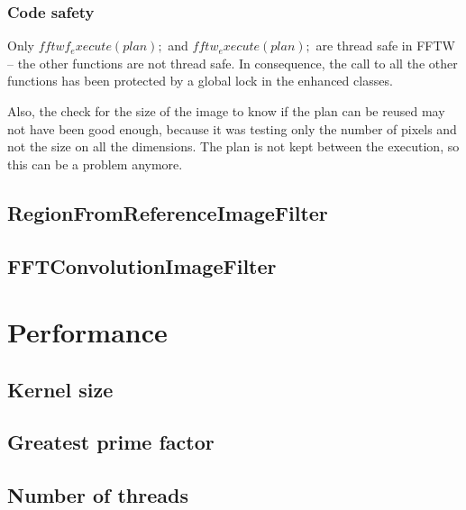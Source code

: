 \documentclass{InsightArticle}
\begin{document}
\subsubsection{Code safety}

Only $fftwf_execute(plan);$ and $fftw_execute(plan);$ are thread safe in FFTW -- the other functions
are not thread safe. In consequence, the call to all the other functions has been protected by a 
global lock in the enhanced classes.

Also, the check for the size of the image to know if the plan can be reused may not have been good 
enough, because it was testing only the number of pixels and not the size on all the dimensions. 
The plan is not kept between the execution, so this can be a problem anymore.

\subsection{RegionFromReferenceImageFilter}

\subsection{FFTConvolutionImageFilter}

\section{Performance}

\subsection{Kernel size}

\subsection{Greatest prime factor}
\label{perf:gpf}

\subsection{Number of threads}


\end{document}
